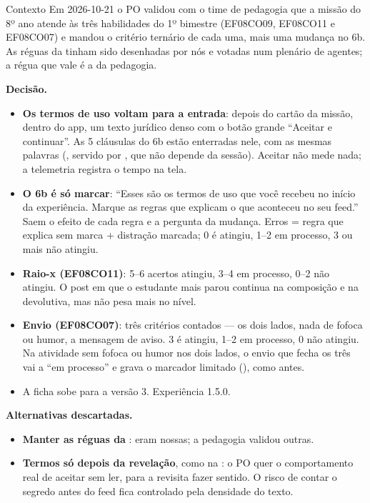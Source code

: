 \begin{especificacao}{Contexto}
Em 2026-10-21 o PO validou com o time de pedagogia que a missão do 8º ano
atende às três habilidades do 1º bimestre (EF08CO09, EF08CO11 e EF08CO07) e
mandou o critério ternário de cada uma, mais uma mudança no 6b. As réguas da
 tinham sido desenhadas por nós e votadas num plenário de
agentes; a régua que vale é a da pedagogia.
\end{especificacao}

\textbf{Decisão.}

\begin{itemize}
  \item \textbf{Os termos de uso voltam para a entrada}: depois do cartão da
    missão, dentro do app, um texto jurídico denso com o botão grande
    \enquote{Aceitar e continuar}. As 5 cláusulas do 6b estão enterradas nele,
    com as mesmas palavras (, servido por
    , que não depende da sessão). Aceitar não
    mede nada; a telemetria registra o tempo na tela.
  \item \textbf{O 6b é só marcar}: \enquote{Esses são os termos de uso que você
    recebeu no início da experiência. Marque as regras que explicam o que
    aconteceu no seu feed.} Saem o efeito de cada regra e a pergunta da
    mudança. Erros = regra que explica sem marca + distração marcada; 0 é
    atingiu, 1--2 em processo, 3 ou mais não atingiu.
  \item \textbf{Raio-x (EF08CO11)}: 5--6 acertos atingiu, 3--4 em processo,
    0--2 não atingiu. O post em que o estudante mais parou continua na
    composição e na devolutiva, mas não pesa mais no nível.
  \item \textbf{Envio (EF08CO07)}: três critérios contados --- os dois lados,
    nada de fofoca ou humor, a mensagem de aviso. 3 é atingiu, 1--2 em
    processo, 0 não atingiu. Na atividade sem fofoca ou humor nos dois lados,
    o envio que fecha os três vai a \enquote{em processo} e grava o marcador
    limitado (), como antes.
  \item A ficha sobe para a versão 3. Experiência 1.5.0.
\end{itemize}

\textbf{Alternativas descartadas.}

\begin{itemize}
  \item \textbf{Manter as réguas da }: eram nossas; a pedagogia
    validou outras.
  \item \textbf{Termos só depois da revelação}, como na : o PO
    quer o comportamento real de aceitar sem ler, para a revisita fazer
    sentido. O risco de contar o segredo antes do feed fica controlado pela
    densidade do texto.
\end{itemize}

